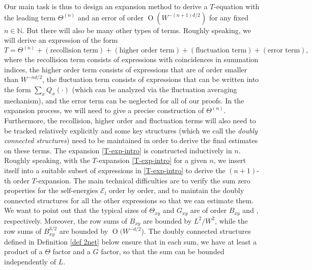 \documentclass{article}
\newcommand{\1}{\mathds{1}}
\numberwithin{equation}{section}
\newcommand{\be}{\begin{equation}}
\newcommand{\ee}{\end{equation}}
\newcommand{\N}{\mathbb{N}}
\newcommand{\selfs}{\text{self-energies}}
\DeclareMathOperator{\OO}{O}
\theoremstyle{plain} %
\theoremstyle{remark}
\newcommand{\Sele}{{\mathcal E}}
\begin{document}
Our main task is thus to design an expansion method to derive a $T$-equation with the leading term $\Theta^{(n)}$ and an error of order   $\OO(W^{-(n+1)d/2})$ for any fixed $n\in \N$. But there will also be many other types of terms. Roughly speaking, we will derive an expression of the form 
\be\label{T-exp-intro}
T = \Theta^{(n)} + (\text{recollision term}) + (\text{higher order term}) + (\text{fluctuation term}) + (\text{error term}),
\ee
where the recollision term consists of expressions with coincidences in summation indices, the higher order term consists of expressions that are of order smaller than $W^{- nd/2}$, 
the fluctuation term consists of expressions that can be written into the form $\sum_x Q_x(\cdot)$ (which can be analyzed 
via the fluctuation averaging mechanism), and the error term can be neglected for all of our proofs. In the expansion process, we will need to give a precise construction of $\Theta^{(n)}$. Furthermore, the recollision, higher order and fluctuation terms will also need to be tracked relatively explicitly and some key structures (which we call the \emph{doubly connected structures}) %
need to be maintained in order to derive the final estimates on these terms. The expansion \eqref{T-exp-intro} is constructed inductively in $n$.  Roughly speaking, with the $T$-expansion \eqref{T-exp-intro} for a given $n$, %
we insert itself into a suitable subset of expressions in \eqref{T-exp-intro} to derive the $(n+1)$-th order $T$-expansion. The main technical difficulties are to verify the sum zero properties for the $\selfs$ $\Sele_l$ order by order, and to maintain the doubly connected structures for all the other expressions so that we can estimate them. 
We want to point out that the typical sizes of $\Theta_{xy}$ and $G_{xy}$ are of order $B_{xy}$ and , respectively. Moreover, the row sums of $B_{xy}$ are bounded by $L^2/W^2$, while the row sums of $B_{xy}^{3/2}$ are bounded by $\OO(W^{-d/2}$). The 
doubly connected structures defined in Definition \ref{def 2net} below ensure that in each sum, we have at least a product of a $\Theta$ factor and a $G$ factor, so that the sum can be bounded independently of $L$.
\end{document}
